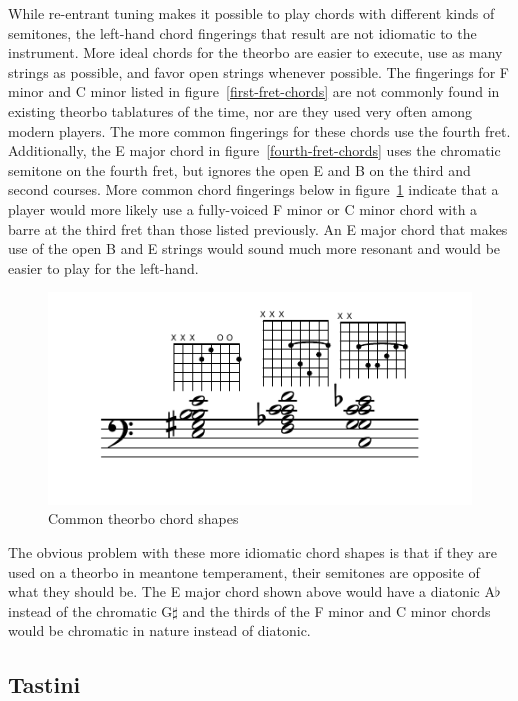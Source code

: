 While re-entrant tuning makes it possible to play chords with different kinds of
semitones, the left-hand chord fingerings that result are not idiomatic to the instrument.
More ideal chords for the theorbo are easier to execute, use as many strings as possible,
and favor open strings whenever possible.  The fingerings for F minor and C minor listed
in figure~\ref{first-fret-chords} are not commonly found in existing theorbo tablatures of the time, nor are
they used very often among modern players. The more common fingerings for these chords
use the fourth fret.  Additionally, the E major chord in figure~\ref{fourth-fret-chords}
uses the chromatic semitone on the fourth fret, but ignores the open E and B on the third
and second courses. More common chord fingerings below in figure~\ref{common-chords} indicate that a player
would more likely use a fully-voiced F minor or C minor chord with a barre at the third
fret than those listed previously.  An E major chord that makes use of the open B and
E strings would sound much more resonant and would be easier to play for the left-hand.
\begin{figure}[h]
\centering
\includegraphics{examples/common-chords.pdf}
\caption{Common theorbo chord shapes}
\label{common-chords}
\end{figure}
The obvious problem with these more idiomatic chord shapes is that if they are used on
a theorbo in meantone temperament, their semitones are opposite of what they should be.
The E major chord shown above would have a diatonic A$\flat$ instead of the chromatic
G$\sharp$ and the thirds of the F minor and C minor chords would be chromatic in nature
instead of diatonic.

\subsection{Tastini}

